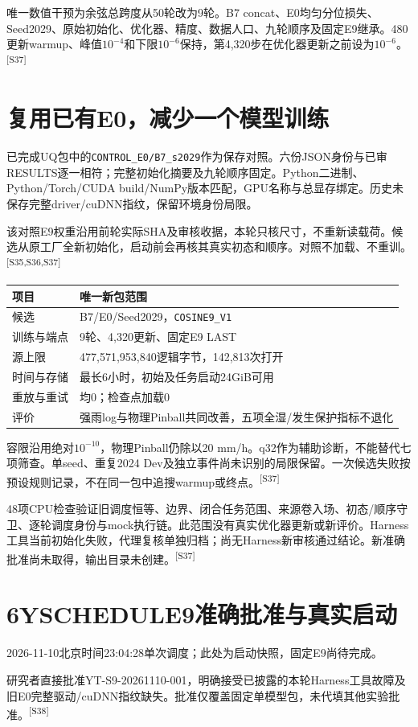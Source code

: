 \documentclass[UTF8,10.5pt,a4paper,fontset=none]{ctexart}
\newcommand{\evi}[1]{\textsuperscript{\color{muted}[#1]}}
\newcommand{\pageheading}[2]{\clearpage\section*{#1}\textcolor{muted}{#2}\par\vspace{3pt}}
\begin{document}
唯一数值干预为余弦总跨度从50轮改为9轮。B7 concat、E0均匀分位损失、Seed2029、原始初始化、优化器、精度、数据人口、九轮顺序及固定E9继承。480更新warmup、峰值$10^{-4}$和下限$10^{-6}$保持，第4,320步在优化器更新之前设为$10^{-6}$。\evi{S37}

\section*{复用已有E0，减少一个模型训练}
已完成UQ包中的\texttt{CONTROL\_E0/B7\_s2029}作为保存对照。六份JSON身份与已审RESULTS逐一相符；完整初始化摘要及九轮顺序固定。Python二进制、Python/Torch/CUDA build/NumPy版本匹配，GPU名称与总显存绑定。历史未保存完整driver/cuDNN指纹，保留环境身份局限。

该对照E9权重沿用前轮实际SHA及审核收据，本轮只核尺寸，不重新读载荷。候选从原工厂全新初始化，启动前会再核其真实初态和顺序。对照不加载、不重训。\evi{S35,S36,S37}

\begin{tabularx}{\textwidth}{@{}p{38mm}X@{}}
\toprule 项目 & 唯一新包范围\\\midrule
候选 & B7/E0/Seed2029，\texttt{COSINE9\_V1}\\
训练与端点 & 9轮、4,320更新、固定E9 LAST\\
源上限 & 477,571,953,840逻辑字节，142,813次打开\\
时间与存储 & 最长6小时，初始及任务启动24GiB可用\\
重放与重试 & 均0；检查点加载0\\
评价 & 强雨log与物理Pinball共同改善，五项全湿/发生保护指标不退化\\
\bottomrule
\end{tabularx}

容限沿用绝对$10^{-10}$，物理Pinball仍除以20 mm/h。q32作为辅助诊断，不能替代七项筛查。单seed、重复2024 Dev及独立事件尚未识别的局限保留。一次候选失败按预设规则记录，不在同一包中追搜warmup或终点。\evi{S37}

48项CPU检查验证旧调度恒等、边界、闭合任务范围、来源卷入场、初态/顺序守卫、逐轮调度身份与mock执行链。此范围没有真实优化器更新或新评价。Harness工具当前初始化失败，代理复核单独归档；尚无Harness新审核通过结论。新准确批准尚未取得，输出目录未创建。\evi{S37}

\pageheading{6Y\quad SCHEDULE9准确批准与真实启动}{2026-11-10北京时间23:04:28单次调度；此处为启动快照，固定E9尚待完成。}
研究者直接批准YT-S9-20261110-001，明确接受已披露的本轮Harness工具故障及旧E0完整驱动/cuDNN指纹缺失。批准仅覆盖固定单模型包，未代填其他实验批准。\evi{S38}
\end{document}

